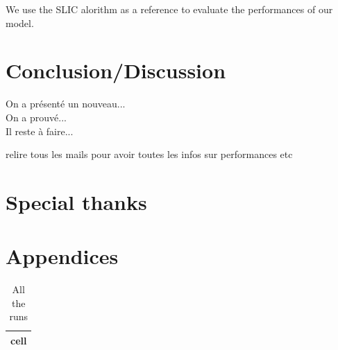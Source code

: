 \documentclass{article}
\begin{document}
        \noindent We use the SLIC alorithm as a reference to evaluate the performances of our model.



\section{Conclusion/Discussion}
On a présenté un nouveau...\\
On a prouvé...\\
Il reste à faire...

relire tous les mails pour avoir toutes les infos sur performances etc

\section*{Special thanks}




\cite{shi_2000}
\cite{arbelaez_2011}
\cite{ren_2005}
\cite{felzenszwalb_2004}
\cite{chang_2019}
\cite{zitnick_2007}
\cite{fulkerson_2009}
\cite{stutz_2017}

\newpage

\section*{Appendices}

\begin{table}
    \centering
    \begin{tabular}{|c|}
        \hline
        cell \\
        \hline
    \end{tabular}
    \caption{All the runs}
\end{table}
\end{document}
